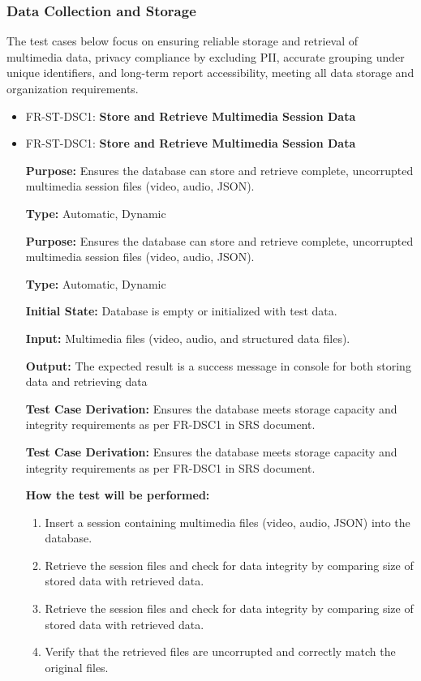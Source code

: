 \documentclass[12pt, titlepage]{article}
\begin{document}
\subsubsection{Data Collection and Storage}

\hspace{2em}The test cases below focus on ensuring reliable storage and retrieval 
of multimedia data, privacy compliance by excluding PII, accurate grouping under 
unique identifiers, and long-term report accessibility, meeting all data storage 
and organization requirements.


\begin{itemize}
  \item FR-ST-DSC1: \textbf{Store and Retrieve Multimedia Session Data}
  \item FR-ST-DSC1: \textbf{Store and Retrieve Multimedia Session Data}
  \begin{mdframed}[linewidth=0.5mm]
      \textbf{Purpose:} Ensures the database can store and retrieve complete, uncorrupted multimedia session files (video, audio, JSON). \par
      \textbf{Type:} Automatic, Dynamic \par
      \textbf{Purpose:} Ensures the database can store and retrieve complete, uncorrupted multimedia session files (video, audio, JSON). \par
      \textbf{Type:} Automatic, Dynamic \par
      \textbf{Initial State:} Database is empty or initialized with test data. \par
      \textbf{Input:} Multimedia files (video, audio, and structured data files). \par
      \textbf{Output:} The expected result is a success message in console for both storing data and retrieving data \par
      \textbf{Test Case Derivation:} Ensures the database meets storage capacity and integrity requirements as per FR-DSC1 in SRS document. \par
      \textbf{Test Case Derivation:} Ensures the database meets storage capacity and integrity requirements as per FR-DSC1 in SRS document. \par
      \textbf{How the test will be performed:}
      \begin{enumerate}[noitemsep]
        \item Insert a session containing multimedia files (video, audio, JSON) into the database.
        \item Retrieve the session files and check for data integrity by comparing size of stored data with retrieved data.
        \item Retrieve the session files and check for data integrity by comparing size of stored data with retrieved data.
        \item Verify that the retrieved files are uncorrupted and correctly match the original files.
      \end{enumerate}
  \end{mdframed}


\end{itemize}
\end{document}
